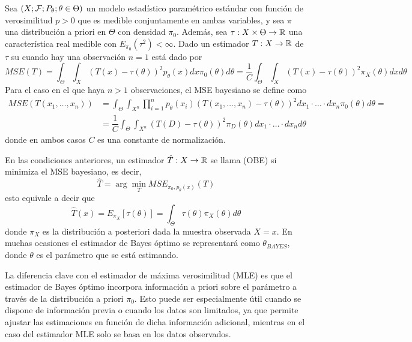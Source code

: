 \begin{definicion}
    Sea $(X ; \mathcal{F} ; P_{\theta}; \theta \in \Theta)$ un modelo estadístico paramétrico estándar con función de verosimilitud $p>0$ que es medible conjuntamente en ambas variables, y sea $\pi$ una distribución a priori en $\Theta$ con densidad $\pi_0$. Además, sea $\tau: X \times \Theta \to \mathbb{R}$ una característica real medible con $E_{\pi_0}(\tau^2) < \infty$. Dado un estimador $T: X \to \mathbb{R}$ de $\tau$ su  cuando hay una observación $n=1$ está dado por
    \begin{equation*}
        MSE(T) =\int_{\Theta} \int_{X} (T(x) - \tau(\theta))^2 p_{\theta}(x) dx \pi_0(\theta) d\theta=\dfrac{1}{C} \int_{\Theta} \int_{X} (T(x) - \tau(\theta))^2 \pi_X(\theta) dx d\theta
    \end{equation*}
    Para el caso en el que haya $n>1$ observaciones, el MSE bayesiano se define como
    \begin{align*}
        MSE(T(x_1,\ldots,x_n)) &= \int_{\Theta} \int_{X^n} \prod_{i=1}^n p_{\theta}(x_i)(T(x_1,\ldots,x_n) - \tau(\theta))^2  dx_1 \cdot \ldots\cdot dx_n \pi_0(\theta) d\theta= \\
        &=\dfrac{1}{C}\int_{\Theta} \int_{X^n} (T(D) - \tau(\theta))^2 \pi_D(\theta) dx_1 \cdot \ldots\cdot dx_n  d\theta
    \end{align*}
    donde en ambos casos $C$ es una constante de normalización.
\end{definicion}

\begin{definicion}
    En las condiciones anteriores, un estimador $\hat{T}: X \to \mathbb{R}$ se llama  (OBE) si minimiza el MSE bayesiano, es decir,
    \begin{equation*}
        \hat{T} = \arg \min_{T} MSE_{\pi_0,p_{\theta}(x)}(T)
    \end{equation*}
    esto equivale a decir que
    \begin{equation*}
        \hat{T}(x) = E_{\pi_X}[\tau(\theta)] = \int_{\Theta} \tau(\theta) \pi_X(\theta) d\theta
    \end{equation*}
    donde $\pi_X$ es la distribución a posteriori dada la muestra observada $X=x$. En muchas ocasiones el estimador de Bayes óptimo se representará como $\theta_{BAYES}$, donde $\theta$ es el parámetro que se está estimando. 
\end{definicion}

\begin{observacion}
    La diferencia clave con el estimador de máxima verosimilitud (MLE) es que el estimador de Bayes óptimo incorpora información a priori sobre el parámetro a través de la distribución a priori $\pi_0$. Esto puede ser especialmente útil cuando se dispone de información previa o cuando los datos son limitados, ya que permite ajustar las estimaciones en función de dicha información adicional, mientras en el caso del estimador MLE solo se basa en los datos observados.
\end{observacion}

